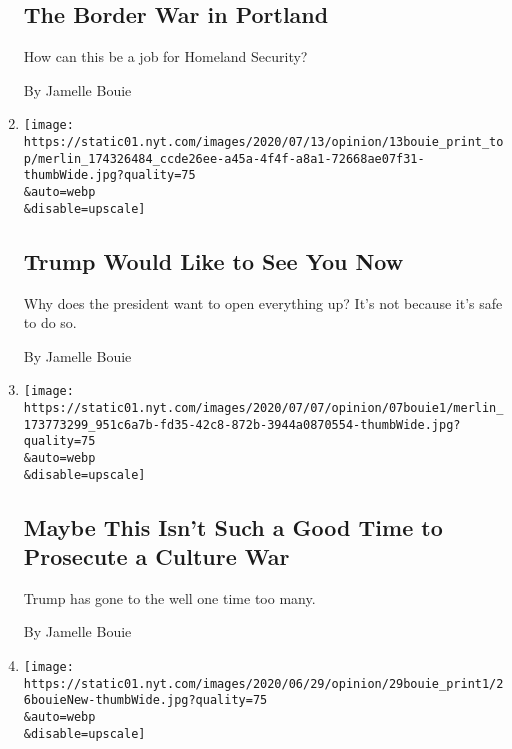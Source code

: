 \begin{enumerate}
  \hypertarget{the-border-war-in-portland}{%
  \subsection{The Border War in
  Portland}\label{the-border-war-in-portland}}

  How can this be a job for Homeland Security?

  By Jamelle Bouie
\item
  \href{/2020/07/10/opinion/trump-schools-reopening.html}{}

  \texttt{[image: https://static01.nyt.com/images/2020/07/13/opinion/13bouie\_print\_top/merlin\_174326484\_ccde26ee-a45a-4f4f-a8a1-72668ae07f31-thumbWide.jpg?quality=75\\\&auto=webp\\\&disable=upscale]}

  \hypertarget{trump-would-like-to-see-you-now}{%
  \subsection{Trump Would Like to See You
  Now}\label{trump-would-like-to-see-you-now}}

  Why does the president want to open everything up? It's not because
  it's safe to do so.

  By Jamelle Bouie
\item
  \href{/2020/07/07/opinion/trump-mount-rushmore-culture-war.html}{}

  \texttt{[image: https://static01.nyt.com/images/2020/07/07/opinion/07bouie1/merlin\_173773299\_951c6a7b-fd35-42c8-872b-3944a0870554-thumbWide.jpg?quality=75\\\&auto=webp\\\&disable=upscale]}

  \hypertarget{maybe-this-isnt-such-a-good-time-to-prosecute-a-culture-war}{%
  \subsection{Maybe This Isn't Such a Good Time to Prosecute a Culture
  War}\label{maybe-this-isnt-such-a-good-time-to-prosecute-a-culture-war}}

  Trump has gone to the well one time too many.

  By Jamelle Bouie
\item
  \href{/2020/06/26/opinion/black-lives-matter-injustice.html}{}

  \texttt{[image: https://static01.nyt.com/images/2020/06/29/opinion/29bouie\_print1/26bouieNew-thumbWide.jpg?quality=75\\\&auto=webp\\\&disable=upscale]}

  \hypertarget{beyond-white-fragility}{%
}
\end{enumerate}
